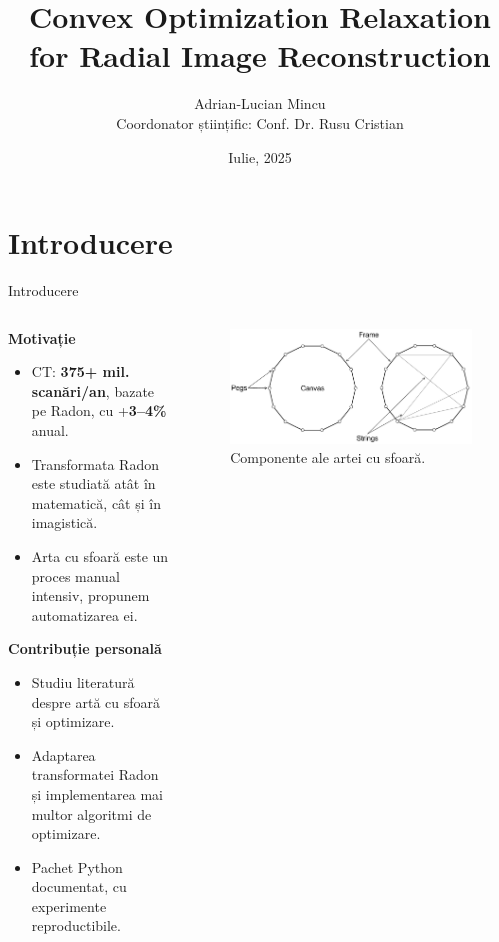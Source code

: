 \documentclass[aspectratio=169,xcolor=dvipsnames]{beamer}
\title{Convex Optimization Relaxation for Radial Image Reconstruction}
\author{
    Adrian-Lucian Mincu\\
    \small Coordonator științific: Conf. Dr. Rusu Cristian
}
\institute
{
    Universitatea din București - Facultatea de Matematică și Informatică
}
\date{Iulie, 2025} %
\begin{document}
\begin{frame}
    \titlepage
\end{frame}

\section{Introducere}

\begin{frame}{Introducere}
    \begin{columns}
        \begin{column}{0.6\textwidth}
            \textbf{Motivație}
            \begin{itemize}
                \item CT: \textbf{375+ mil. scanări/an}, bazate pe Radon, cu +\textbf{3–4\%} anual.
                \item Transformata Radon este studiată atât în matematică, cât și în imagistică.
                \item Arta cu sfoară este un proces manual intensiv, propunem automatizarea ei.
            \end{itemize}

            \vspace{0.25cm}

            \textbf{Contribuție personală}
            \begin{itemize}
                \item Studiu literatură despre artă cu sfoară și optimizare.
                \item Adaptarea transformatei Radon și implementarea mai multor algoritmi de optimizare.
                \item Pachet Python documentat, cu experimente reproductibile.
            \end{itemize}
        \end{column}

        \begin{column}{0.4\textwidth}
            \begin{figure}
                \includegraphics[width=\linewidth]{images/stringart_components.pdf}
                \caption{Componente ale artei cu sfoară.}
            \end{figure}
        \end{column}
    \end{columns}
\end{frame}
\end{document}
